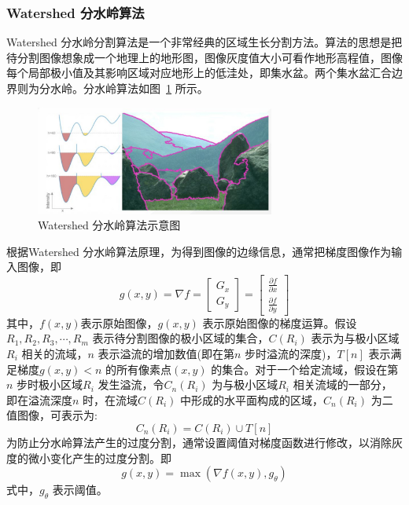 \subsubsection{Watershed 分水岭算法}
\label{subsubsec:chap02-1-1-1}
Watershed 分水岭分割算法是一个非常经典的区域生长分割方法。算法的思想是把待分割图像想象成一个地理上的地形图，图像灰度值大小可看作地形高程值，图像每个局部极小值及其影响区域对应地形上的低洼处，即集水盆。两个集水盆汇合边界则为分水岭。分水岭算法如图~\ref{fig:watershed} 所示。

\begin{figure}[htb]
  \centering
  \includegraphics[width=0.7\textwidth]{figures/watershed}
  \caption{Watershed 分水岭算法示意图 }\label{fig:watershed}
\end{figure}

根据Watershed 分水岭算法原理，为得到图像的边缘信息，通常把梯度图像作为输入图像，即
\begin{equation}
  \label{eq:2-1}
  g(x,y) = \nabla f = \left[
    \begin{matrix}
      G_x \\
      G_y
    \end{matrix}
    \right] =
  \left[
    \begin{matrix}
      \frac{\partial f}{\partial x} \\
      \frac{\partial f}{\partial y}
    \end{matrix}
    \right]
\end{equation}
其中，$f(x,y)$表示原始图像，$g(x,y)$ 表示原始图像的梯度运算。假设$R_1,R_2,R_3,\cdots,R_m$ 表示待分割图像的极小区域的集合，$C(R_i)$ 表示为与极小区域$R_i$ 相关的流域，$n$ 表示溢流的增加数值(即在第$n$ 步时溢流的深度)，$T[n]$ 表示满足梯度$g(x,y)<n$ 的所有像素点$(x,y)$ 的集合。对于一个给定流域，假设在第$n$ 步时极小区域$R_i$ 发生溢流，令$C_n(R_i)$ 为与极小区域$R_i$ 相关流域的一部分，即在溢流深度$n$ 时，在流域$C(R_i)$ 中形成的水平面构成的区域，$C_n(R_i)$ 为二值图像，可表示为:
\begin{equation}
  \label{eq:2-2}
  C_n(R_i) = C(R_i)\cup T[n]
\end{equation}
为防止分水岭算法产生的过度分割，通常设置阈值对梯度函数进行修改，以消除灰度的微小变化产生的过度分割。即
\begin{equation}
  \label{eq:2-3}
  g(x,y) = \max ( \nabla f(x,y),g_{\theta})
\end{equation}
式中，$g_{\theta}$ 表示阈值。

